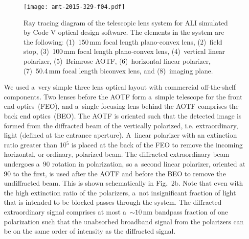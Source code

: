 \documentclass[amt]{copernicus}
\begin{document}
\begin{figure*}[t]
\texttt{[image: amt-2015-329-f04.pdf]}
\caption{Ray tracing diagram of the telescopic lens system for ALI
  simulated by Code V optical design software. The elements in the
  system are the following: (1)~150\,\unit{mm} focal length
  plano-convex lens, (2)~field stop,  (3)~100\,\unit{mm} focal length
  plano-convex lens, (4)~vertical linear polarizer, (5)~Brimrose
  AOTF, (6)~horizontal linear polarizer, (7)~50.4\,\unit{mm} focal
  length biconvex lens, and (8)~imaging plane.}
\end{figure*}

We used a~very simple three lens optical layout with commercial
off-the-shelf components. Two lenses before the AOTF form a~simple
telescope for the front end optics~(FEO), and a~single focusing lens
behind the AOTF comprises the back end optics~(BEO). The AOTF is
oriented such that the detected image is formed from the diffracted
beam of the vertically polarized, i.e. extraordinary, light (defined
at the entrance aperture).  A~linear polarizer with an extinction
ratio greater than 10$^{5}$ is placed at the back of the FEO to
remove the incoming horizontal, or ordinary, polarized beam. The
diffracted extraordinary beam undergoes a~90{\degree} rotation in
polarization, so a~second linear polarizer, oriented at 90{\degree} to
the first, is used after the AOTF and before the BEO to remove the
undiffracted beam. This is shown schematically in Fig.~2b. Note that
even with the high extinction ratio of the polarizers, a~not
insignificant fraction of light that is intended to be blocked passes
through the system.  The diffracted extraordinary signal comprises at
most a~$\sim 10$\,\unit{nm} bandpass fraction of one polarization such
that the unabsorbed broadband signal from the polarizers can be on the
same order of intensity as the diffracted signal.\hack{\newpage}
\end{document}
